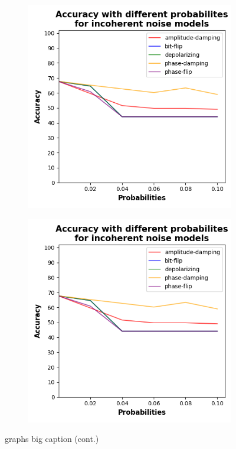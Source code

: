 \begin{figure}[!b]
    \medskip
    
    \begin{subfigure}{0.39\textwidth}
        \includegraphics[width=\linewidth]{figures/accuracy-graph.png}
        \label{fig:arm9}
    \end{subfigure}
    \begin{subfigure}{0.39\textwidth}
        \includegraphics[width=\linewidth]{figures/accuracy-graph.png}
        \label{fig:arm10}
    \end{subfigure}

    \caption{graphs big caption (cont.)}
\end{figure}

